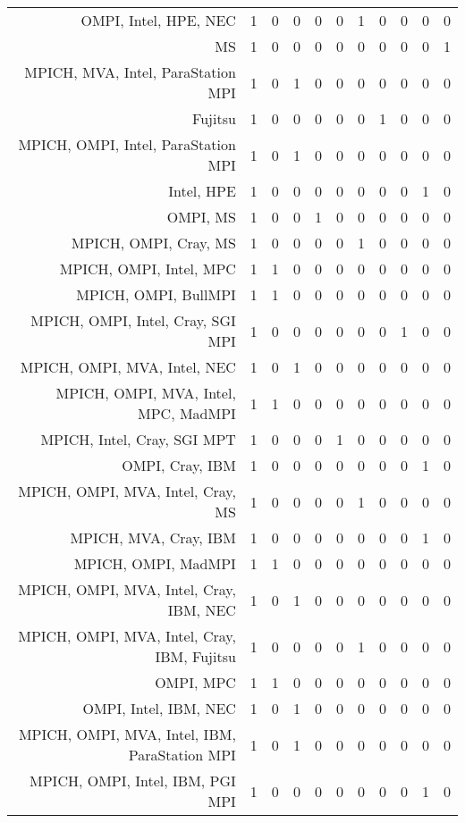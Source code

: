 {\begin{landscape}
\begin{longtable}[htb]{r|c|c|c|c|c|c|c|c|c|c}
{OMPI, Intel, HPE, NEC} & 1 & 0 & 0 & 0 & 0 & 1 & 0 & 0 & 0 & 0 \\%
{MS} & 1 & 0 & 0 & 0 & 0 & 0 & 0 & 0 & 0 & 1 \\%
{MPICH, MVA, Intel, ParaStation MPI} & 1 & 0 & 1 & 0 & 0 & 0 & 0 & 0 & 0 & 0 \\%
{Fujitsu} & 1 & 0 & 0 & 0 & 0 & 0 & 1 & 0 & 0 & 0 \\%
{MPICH, OMPI, Intel, ParaStation MPI} & 1 & 0 & 1 & 0 & 0 & 0 & 0 & 0 & 0 & 0 \\%
{Intel, HPE} & 1 & 0 & 0 & 0 & 0 & 0 & 0 & 0 & 1 & 0 \\%
{OMPI, MS} & 1 & 0 & 0 & 1 & 0 & 0 & 0 & 0 & 0 & 0 \\%
{MPICH, OMPI, Cray, MS} & 1 & 0 & 0 & 0 & 0 & 1 & 0 & 0 & 0 & 0 \\%
{MPICH, OMPI, Intel, MPC} & 1 & 1 & 0 & 0 & 0 & 0 & 0 & 0 & 0 & 0 \\%
{MPICH, OMPI, BullMPI} & 1 & 1 & 0 & 0 & 0 & 0 & 0 & 0 & 0 & 0 \\%
{MPICH, OMPI, Intel, Cray, SGI MPI} & 1 & 0 & 0 & 0 & 0 & 0 & 0 & 1 & 0 & 0 \\%
{MPICH, OMPI, MVA, Intel, NEC} & 1 & 0 & 1 & 0 & 0 & 0 & 0 & 0 & 0 & 0 \\%
{MPICH, OMPI, MVA, Intel, MPC, MadMPI} & 1 & 1 & 0 & 0 & 0 & 0 & 0 & 0 & 0 & 0 \\%
{MPICH, Intel, Cray, SGI MPT} & 1 & 0 & 0 & 0 & 1 & 0 & 0 & 0 & 0 & 0 \\%
{OMPI, Cray, IBM} & 1 & 0 & 0 & 0 & 0 & 0 & 0 & 0 & 1 & 0 \\%
{MPICH, OMPI, MVA, Intel, Cray, MS} & 1 & 0 & 0 & 0 & 0 & 1 & 0 & 0 & 0 & 0 \\%
{MPICH, MVA, Cray, IBM} & 1 & 0 & 0 & 0 & 0 & 0 & 0 & 0 & 1 & 0 \\%
{MPICH, OMPI, MadMPI} & 1 & 1 & 0 & 0 & 0 & 0 & 0 & 0 & 0 & 0 \\%
{MPICH, OMPI, MVA, Intel, Cray, IBM, NEC} & 1 & 0 & 1 & 0 & 0 & 0 & 0 & 0 & 0 & 0 \\%
{MPICH, OMPI, MVA, Intel, Cray, IBM, Fujitsu} & 1 & 0 & 0 & 0 & 0 & 1 & 0 & 0 & 0 & 0 \\%
{OMPI, MPC} & 1 & 1 & 0 & 0 & 0 & 0 & 0 & 0 & 0 & 0 \\%
{OMPI, Intel, IBM, NEC} & 1 & 0 & 1 & 0 & 0 & 0 & 0 & 0 & 0 & 0 \\%
{MPICH, OMPI, MVA, Intel, IBM, ParaStation MPI} & 1 & 0 & 1 & 0 & 0 & 0 & 0 & 0 & 0 & 0 \\%
{MPICH, OMPI, Intel, IBM, PGI MPI} & 1 & 0 & 0 & 0 & 0 & 0 & 0 & 0 & 1 & 0 \\%

\end{longtable}
\end{landscape}}

